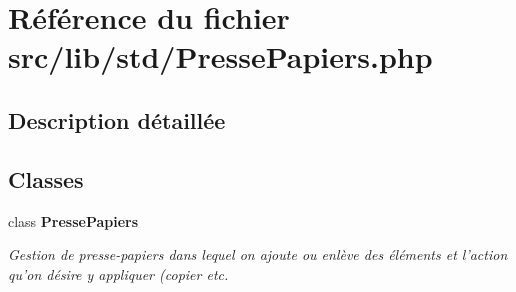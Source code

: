 \section{Référence du fichier src/lib/std/PressePapiers.php}
\label{_presse_papiers_8php}


\subsection{Description détaillée}


\subsection*{Classes}
\begin{CompactItemize}
\item 
class {\bf PressePapiers}
\begin{CompactList}\small\item\em Gestion de presse-papiers dans lequel on ajoute ou enlève des éléments et l'action qu'on désire y appliquer (copier etc. \item\end{CompactList}\end{CompactItemize}
